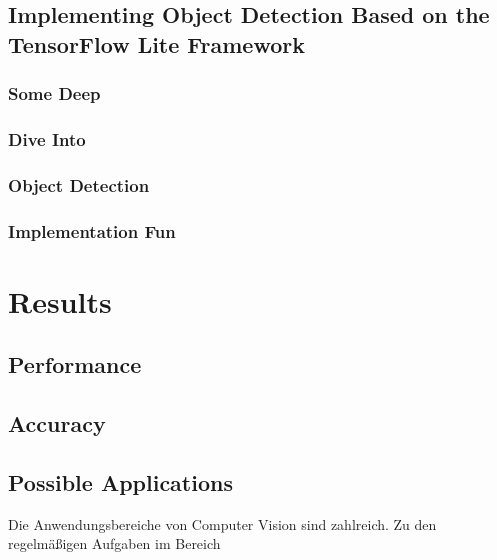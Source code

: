 \documentclass[
			   fontsize=11pt,
               paper=a4,
               bibliography=totoc,
               idxtotoc,
               headsepline,
               footsepline,
               footinclude=false,
               BCOR=12mm,
               DIV=13,
               openany,   %
               ]
               {scrbook}
\begin{document}
\section{Implementing Object Detection Based on the TensorFlow Lite Framework}

\subsection{Some Deep}
\subsection{Dive Into}
\subsection{Object Detection}
\subsection{Implementation Fun}


\chapter{Results}

\section{Performance}

\section{Accuracy}

\section{Possible Applications} %

Die Anwendungsbereiche von Computer Vision sind zahlreich. Zu den regelmäßigen Aufgaben im Bereich 


\end{document}
